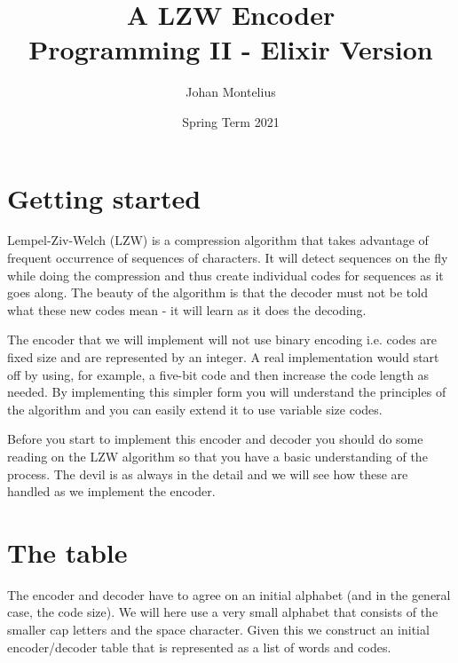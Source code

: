 \documentclass[a4paper,11pt]{article}
\begin{document}

\title{
    \textbf{A LZW Encoder}\\
    \large{Programming II - Elixir Version}
}
\author{Johan Montelius}
\date{Spring Term 2021}
\maketitle
{}



\section*{Getting started}

Lempel-Ziv-Welch (LZW) is a compression algorithm that takes advantage
of frequent occurrence of sequences of characters. It will detect
sequences on the fly while doing the compression and thus create
individual codes for sequences as it goes along. The beauty of the
algorithm is that the decoder must not be told what these new codes
mean - it will learn as it does the decoding.

The encoder that we will implement will not use binary encoding
i.e. codes are fixed size and are represented by an integer. A real
implementation would start off by using, for example, a five-bit code
and then increase the code length as needed. By implementing this
simpler form you will understand the principles of the algorithm and
you can easily extend it to use variable size codes.

Before you start to implement this encoder and decoder you should do
some reading on the LZW algorithm so that you have a basic
understanding of the process. The devil is as always in the detail and
we will see how these are handled as we implement the encoder.



\section{The table}

The encoder and decoder have to agree on an initial alphabet (and in
the general case, the code size). We will here use a very small
alphabet that consists of the smaller cap letters and the space
character. Given this we construct an initial encoder/decoder table
that is represented as a list of words and codes.
\end{document}
